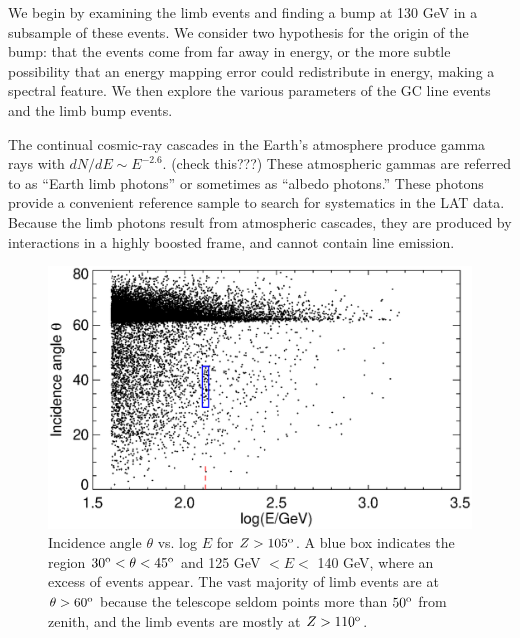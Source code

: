 \documentclass[aps,twocolumn,prd,superscriptaddress,showpacs,nofootinbib,fixfloat]{revtex4}
\newcommand{\degree}{^{\rm o}}
\begin{document}
We begin by examining the limb events and finding a bump at 130 GeV in a
subsample of these events.  We consider two hypothesis for the origin of the
bump: that the events come from far away in energy, or the more subtle
possibility that an energy mapping error could redistribute in energy, making
a spectral feature.  We then explore the various parameters of the GC line
events and the limb bump events. 

The continual cosmic-ray cascades in the Earth's atmosphere produce gamma rays
with $dN/dE \sim E^{-2.6}$.  (check this???)  These atmospheric gammas are
referred to as ``Earth limb photons'' or sometimes as ``albedo photons.''
These photons provide a convenient reference sample to search for systematics
in the LAT data.  Because the limb photons result from atmospheric cascades,
they are produced by interactions in a highly boosted frame, and cannot
contain line emission. 

\begin{figure}[p]
  \centering
  \includegraphics[width=1.0\linewidth]{plots/theta-E.ps}
  \caption{Incidence angle $\theta$ vs. log $E$ for $Z > 105\degree$.  A blue
  box indicates the region $30\degree < \theta < 45\degree$ and 125 GeV $< E
  <$ 140 GeV, where an excess of events appear.  The vast majority of limb
  events are at $\theta > 60\degree$ because the telescope seldom points more
  than $50\degree$ from zenith, and the limb events are mostly at
  $Z>110\degree$.}
  \label{fig:theta-E}
\end{figure}
\end{document}
